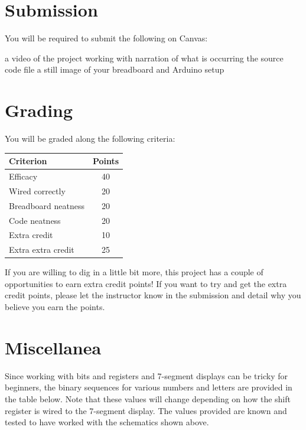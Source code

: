 \newpage
\begin{widepar}
    \section*{Submission}
    You will be required to submit the following on Canvas:
    \begin{outline}
        \1 a video of the project working with narration of what is occurring
        \1 the source code file
        \1 a still image of your breadboard and Arduino setup
    \end{outline}

    \section*{Grading}
    You will be graded along the following criteria:

    \begin{table}[h!]
        \begin{tabular}{ l | c }
            \toprule
            Criterion & Points \\

            \midrule
            Efficacy & 40 \\
            Wired correctly & 20 \\
            Breadboard neatness & 20 \\
            Code neatness & 20 \\
            Extra credit & 10 \\
            Extra extra credit \footnotemark & 25 \\

            \bottomrule
        \end{tabular}
    \end{table}

    If you are willing to dig in a little bit more, this project has a couple of opportunities to earn extra credit points!
    If you want to try and get the extra credit points, please let the instructor know in the submission and detail why you believe you earn the points.

    \section*{Miscellanea}
    Since working with bits and registers and 7-segment displays can be tricky for beginners, the binary sequences for various numbers and letters are provided in the table below. Note that these values will change depending on how the shift register is wired to the 7-segment display. The values provided are known and tested to have worked with the schematics shown above.


\end{widepar}
